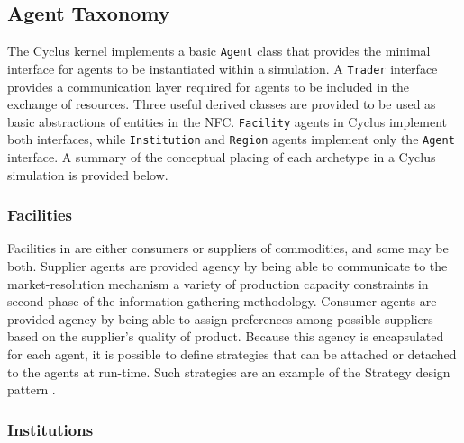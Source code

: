 \subsection{Agent Taxonomy}\label{abm:abm:tax}

The Cyclus kernel implements a basic \texttt{Agent} class that provides the
minimal interface for agents to be instantiated within a simulation. A
\texttt{Trader} interface provides a communication layer required for agents to be
included in the exchange of resources. Three useful derived classes are provided
to be used as basic abstractions of entities in the NFC. \texttt{Facility} agents
in Cyclus implement both interfaces, while \texttt{Institution} and \texttt{Region}
agents implement only the \texttt{Agent} interface.  A summary of the conceptual
placing of each archetype in a Cyclus simulation is provided below.

\subsubsection{Facilities}

Facilities in \Cyclus are either consumers or suppliers of commodities, and some
may be both. Supplier agents are provided agency by being able to communicate to
the market-resolution mechanism a variety of production capacity constraints in
second phase of the information gathering methodology. Consumer agents are
provided agency by being able to assign preferences among possible suppliers
based on the supplier's quality of product. Because this agency is encapsulated
for each agent, it is possible to define strategies that can be attached or
detached to the agents at run-time. Such strategies are an example of the
Strategy design pattern \cite{vlissides_design_1995}.

\subsubsection{Institutions}

